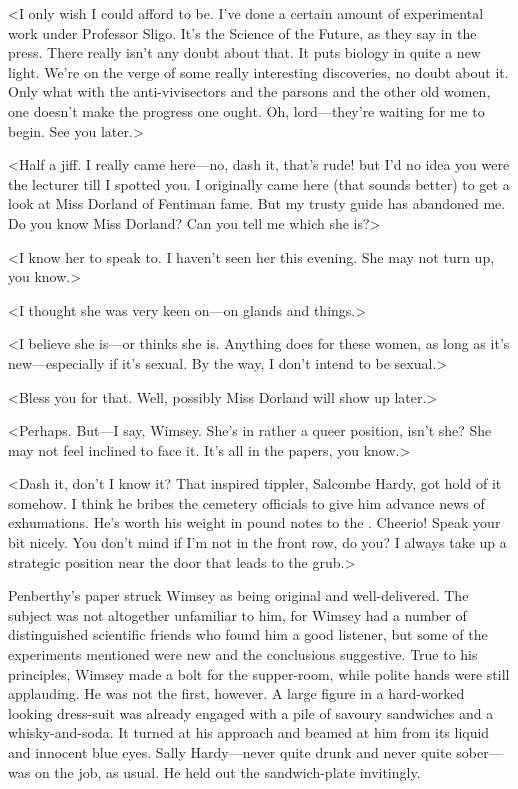 <I only wish I could afford to be. I've done a certain amount of experimental work under Professor Sligo. It's the Science of the Future, as they say in the press. There really isn't any doubt about that. It puts biology in quite a new light. We're on the verge of some really interesting discoveries, no doubt about it. Only what with the anti-vivisectors and the parsons and the other old women, one doesn't make the progress one ought. Oh, lord—they're waiting for me to begin. See you later.>

<Half a jiff. I really came here—no, dash it, that's rude! but I'd no idea you were the lecturer till I spotted you. I originally came here (that sounds better) to get a look at Miss Dorland of Fentiman fame. But my trusty guide has abandoned me. Do you know Miss Dorland? Can you tell me which she is?>

<I know her to speak to. I haven't seen her this evening. She may not turn up, you know.>

<I thought she was very keen on—on glands and things.>

<I believe she is—or thinks she is. Anything does for these women, as long as it's new—especially if it's sexual. By the way, I don't intend to be sexual.>

<Bless you for that. Well, possibly Miss Dorland will show up later.>

<Perhaps. But—I say, Wimsey. She's in rather a queer position, isn't she? She may not feel inclined to face it. It's all in the papers, you know.>

<Dash it, don't I know it? That inspired tippler, Salcombe Hardy, got hold of it somehow. I think he bribes the cemetery officials to give him advance news of exhumations. He's worth his weight in pound notes to the . Cheerio! Speak your bit nicely. You don't mind if I'm not in the front row, do you? I always take up a strategic position near the door that leads to the grub.>

Penberthy's paper struck Wimsey as being original and well-delivered. The subject was not altogether unfamiliar to him, for Wimsey had a number of distinguished scientific friends who found him a good listener, but some of the experiments mentioned were new and the conclusions suggestive. True to his principles, Wimsey made a bolt for the supper-room, while polite hands were still applauding. He was not the first, however. A large figure in a hard-worked looking dress-suit was already engaged with a pile of savoury sandwiches and a whisky-and-soda. It turned at his approach and beamed at him from its liquid and innocent blue eyes. Sally Hardy—never quite drunk and never quite sober—was on the job, as usual. He held out the sandwich-plate invitingly.

